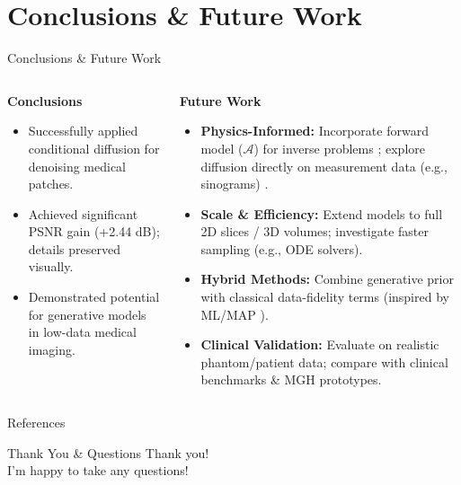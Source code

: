 \documentclass[10pt]{beamer}
\newcommand{\op}[1]{\mathcal{#1}}
\begin{document}
\section{Conclusions \& Future Work}
\begin{frame}{Conclusions \& Future Work}
  \begin{columns}[T]
    \begin{column}{0.45\textwidth}
      \textbf{Conclusions}
      \begin{itemize}\small\itemsep 0.2em
        \item Successfully applied conditional diffusion for denoising medical patches.
        \item Achieved significant PSNR gain (+2.44 dB); details preserved visually.
        \item Demonstrated potential for generative models in low-data medical imaging.
      \end{itemize}
      \vfill
    \end{column}

    \begin{column}{0.55\textwidth}
      \textbf{Future Work}
      \footnotesize
      \begin{itemize}\itemsep -0.1em
        \item \textbf{Physics-Informed:} Incorporate forward model ($\op{A}$) for inverse problems \cite{song2022solvinginverseproblemsmedical}; explore diffusion directly on measurement data (e.g., sinograms) \cite{song2021scorebasedgenerativemodelingstochastic}.

        \item \textbf{Scale \& Efficiency:} Extend models to full 2D slices / 3D volumes; investigate faster sampling (e.g., ODE solvers).

        \item \textbf{Hybrid Methods:} Combine generative prior with classical data-fidelity terms (inspired by ML/MAP \cite{4307558}).

        \item \textbf{Clinical Validation:} Evaluate on realistic phantom/patient data; compare with clinical benchmarks \& MGH prototypes.
      \end{itemize}
    \end{column}
  \end{columns}
\end{frame}
\begin{frame}[allowframebreaks]{References}

    \printbibliography

\end{frame}

\begin{frame}{Thank You \& Questions}
  \centering
  {\Large Thank you! \\[1em]
  I’m happy to take any questions!}
\end{frame}
\end{document}
